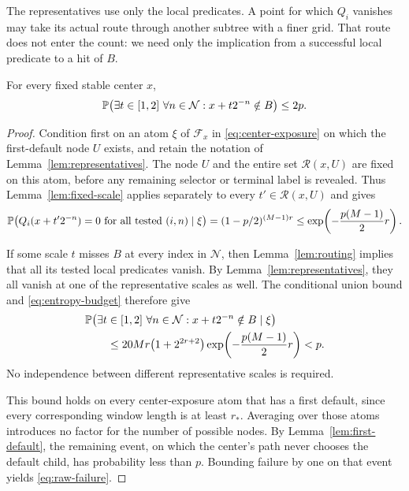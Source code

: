 The representatives use only the local predicates.  A point for which
$Q_i$ vanishes may take its actual route through another subtree with
a finer grid.  That route does not enter the count: we need only the
implication from a successful local predicate to a hit of $B$.

\begin{proposition}\label{prop:raw-failure}
For every fixed stable center $x$,
\begin{equation}
 \mathbb P\bigl(\exists t\in[1,2]\ \forall n\in\mathcal N:
 x+t2^{-n}\notin B\bigr)\le2p.
 \label{eq:raw-failure}
\end{equation}
\end{proposition}

\begin{proof}
Condition first on an atom $\xi$ of $\mathcal F_x$ in \eqref{eq:center-exposure} on which the
first-default node $U$ exists, and retain the notation of
Lemma~\ref{lem:representatives}.  The node $U$ and the entire set
$\mathcal R(x,U)$ are fixed on this atom, before any remaining
selector or terminal label is revealed.  Thus Lemma~\ref{lem:fixed-scale}
applies separately to every $t'\in\mathcal R(x,U)$ and gives
\[
 \mathbb P\bigl(Q_i(x+t'2^{-n})=0\text{ for all tested }(i,n)
       \mid\xi\bigr)
 =(1-p/2)^{(M-1)r}
 \le\exp\!\left(-\frac{p(M-1)}2r\right).
\]

If some scale $t$ misses $B$ at every index in $\mathcal N$, then
Lemma~\ref{lem:routing} implies that all its tested local predicates
vanish.  By Lemma~\ref{lem:representatives}, they all vanish at one
of the representative scales as well.  The conditional union bound
and \eqref{eq:entropy-budget} therefore give
\begin{align*}
 &\mathbb P\bigl(\exists t\in[1,2]\ \forall n\in\mathcal N:
 x+t2^{-n}\notin B\mid\xi\bigr)\\
 &\qquad\le
 20Mr\bigl(1+2^{2r+2}\bigr)
 \exp\!\left(-\frac{p(M-1)}2r\right)<p.
\end{align*}
No independence between different representative scales is required.

This bound holds on every center-exposure atom that has a first
default, since every corresponding window length is at least $r_*$.
Averaging over those atoms introduces no factor for the number of
possible nodes.  By Lemma~\ref{lem:first-default}, the remaining
event, on which the center's path never chooses the default child,
has probability less than $p$.  Bounding failure by one on that
event yields \eqref{eq:raw-failure}.
\end{proof}
